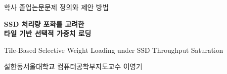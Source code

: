 \begin{frame}[plain]

  \vspace{21mm}

  {\scriptsize\color{muted}학사 졸업논문\quad 문제 정의와 제안 방법}\par
  \vspace{2.5mm}

  {\fontsize{19pt}{27pt}\selectfont\bfseries SSD 처리량 포화를 고려한\\타일 기반 선택적 가중치 로딩}\par
  \vspace{3mm}

  {\footnotesize\color{muted}Tile-Based Selective Weight Loading under SSD Throughput Saturation}\par
  \vspace{11mm}

  \par
  \vspace{4mm}

  {\footnotesize 설한동\quad\color{muted}서울대학교 컴퓨터공학부\quad 지도교수 이영기}

\end{frame}
